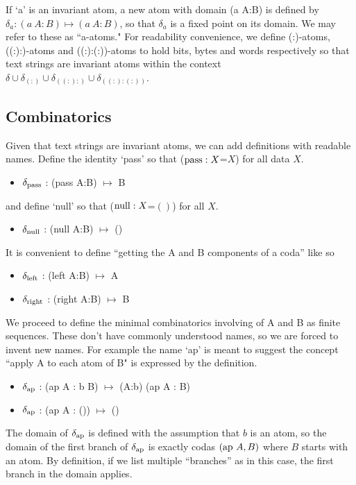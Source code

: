 \documentclass[11pt]{article}
\begin{document}
If `a' is an invariant atom, a new atom with domain (a A:B) is defined by $\delta_a: (a\ A:B)\mapsto (a\ A:B)$, so that $\delta_a$ is a fixed point on its domain.  
We may refer to these as ``a-atoms."  For readability convenience, we define (:)-atoms, ((:):)-atoms and ((:):(:))-atoms to hold bits, bytes and words respectively
so that text strings are invariant atoms within the context $\delta\cup\delta_{(:)}\cup\delta_{((:):)}\cup\delta_{((:):(:))}$.

\subsection{Combinatorics} 

Given that text strings are invariant atoms, we can add definitions with readable names.  Define the identity `pass' so that (${\rm pass}:X$=$X$) for all data $X$.  
\begin{itemize}
\item{$\delta_{\rm pass}$ : ({\rm pass} A:B) $\mapsto$ B}
\end{itemize}
and define `null' so that (${\rm null}:X$=$()$) for all $X$.
\begin{itemize}
\item{$\delta_{\rm null}$ : ({\rm null} A:B) $\mapsto$ ()}
\end{itemize}
It is convenient to define ``getting the A and B components of a coda'' like so
\begin{itemize}
\item{$\delta_{\rm left}$ : ({\rm left} A:B) $\mapsto$ A} 
\item{$\delta_{\rm right}$ : ({\rm right} A:B) $\mapsto$ B} 
\end{itemize}
We proceed to define the minimal combinatorics involving of A and B as finite sequences.  These don't have 
commonly understood names, so we are forced to invent new names.  For example the name `ap' is meant to suggest the 
concept ``apply A to each atom of B" is expressed by the definition.  
\begin{itemize}
\item{$\delta_{\rm ap}$ : ({\rm ap} A : b B) $\mapsto$ (A:b) ({\rm ap} A : B)}
\item{$\delta_{\rm ap}$ : ({\rm ap} A : ()) $\mapsto$ ()} 
\end{itemize} 
The domain of $\delta_{\rm ap}$ is defined with the assumption that $b$ is an atom, so the domain of the first branch of $\delta_{\rm ap}$ is exactly 
codas $({\rm ap}\ A,B)$ where $B$ starts with an atom.  By definition, if we list multiple ``branches'' as in this case, the first branch in the domain applies.  
\end{document}
